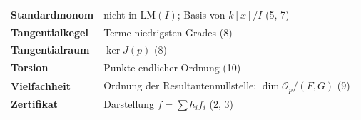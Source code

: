 \begin{merksatz}
\begin{center}
{\begin{tabular}{@{}P{3.4cm}P{5.2cm}@{}}
\textbf{Standardmonom} & nicht in $\mathrm{LM}(I)$; Basis von $k[x]/I$ (5, 7)\\
\textbf{Tangentialkegel} & Terme niedrigsten Grades (8)\\
\textbf{Tangentialraum} & $\ker J(p)$ (8)\\
\textbf{Torsion} & Punkte endlicher Ordnung (10)\\
\textbf{Vielfachheit} & Ordnung der Resultantennullstelle; $\dim\mathcal O_p/(F, G)$ (9)\\
\textbf{Zertifikat} & Darstellung $f = \sum h_if_i$ (2, 3)\\
\bottomrule
\end{tabular}}
\end{center}
\end{merksatz}

